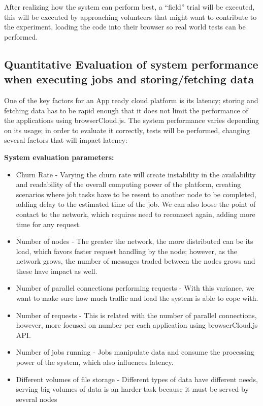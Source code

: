 After realizing how the system can perform best, a ``field'' trial will be executed, this will be executed by approaching volunteers that might want to contribute to the experiment, loading the code into their browser so real world tests can be performed.

\subsection{Quantitative Evaluation of system performance when executing jobs and storing/fetching data}

One of the key factors for an App ready cloud platform is its latency; storing and fetching data has to be rapid enough that it does not limit the performance of the applications using browserCloud.js. The system performance varies depending on its usage; in order to evaluate it correctly, tests will be performed, changing several factors that will impact latency:

\textbf{System evaluation parameters:}
\begin{itemize}
  \item Churn Rate - Varying the churn rate will create instability in the availability and readability of the overall computing power of the platform, creating scenarios where job tasks have to be resent to another node to be completed, adding delay to the estimated time of the job. We can also loose the point of contact to the network, which requires need to reconnect again, adding more time for any request.
  \item Number of nodes - The greater the network, the more distributed can be its load, which favors faster request handling by the node; however, as the network grows, the number of messages traded between the nodes grows and these have impact as well. 
  \item Number of parallel connections performing requests - With this variance, we want to make sure how much traffic and load the system is able to cope with.
  \item Number of requests - This is related with the number of parallel connections, however, more focused on number per each application using browserCloud.js API.
  \item Number of jobs running - Jobs manipulate data and consume the processing power of the system, which also influences latency.
  \item Different volumes of file storage - Different types of data have different needs, serving big volumes of data is an harder task because it must be served by several nodes
\end{itemize}

